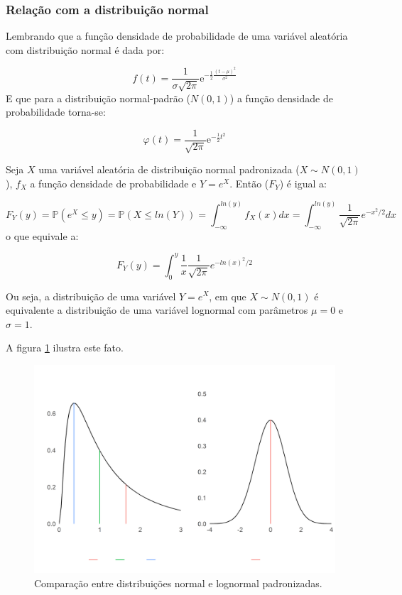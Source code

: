 \documentclass[a4paper]{article}
\begin{document}
\subsubsection{Relação com a distribuição
normal}\label{relacao-com-a-distribuicao-normal}

Lembrando que a função densidade de probabilidade de uma variável
aleatória com distribuição normal é dada por:

\[f(t) = \frac{1}{\sigma\sqrt{2\pi}}\mathrm{e}^{-\frac{1}{2}\frac{(t-\mu)^2}{\sigma^2}}\]
E que para a distribuição normal-padrão (\(N(0,1)\)) a função densidade
de probabilidade torna-se:

\[\varphi(t) = \frac{1}{\sqrt{2\pi}}\mathrm{e}^{-\frac{1}{2}t^2}\]

Seja \(X\) uma variável aleatória de distribuição normal padronizada
(\(X \sim N(0, 1)\)), \(f_X\) a função densidade de probabilidade e
\(Y = e^X\). Então (\(F_Y\)) é igual a:

\[F_Y(y) = \mathbb{P}(e^X\leq y) = \mathbb{P}(X \leq ln(Y)) = \int_{-\infty}^{ln(y)}f_X(x)dx = \int_{-\infty}^{ln(y)}\frac{1}{\sqrt{2\pi}}e^{-x^2/2}dx\]
o que equivale a:

\[F_Y(y) = \int_{0}^{y}\frac{1}{x}\frac{1}{\sqrt{2\pi}}e^{-ln(x)^2/2}\]

Ou seja, a distribuição de uma variável \(Y = e^X\), em que
\(X \sim N(0,1)\) é equivalente a distribuição de uma variável lognormal
com parâmetros \(\mu = 0\) e \(\sigma = 1\).

A figura \ref{fig:normal_lognormal} ilustra este fato.

\begin{figure}[H]

{\centering \includegraphics[width=1\linewidth]{images/normal_lognormal-1} 

}

\caption{Comparação entre distribuições normal e lognormal padronizadas.}\label{fig:normal_lognormal}
\end{figure}
\end{document}
